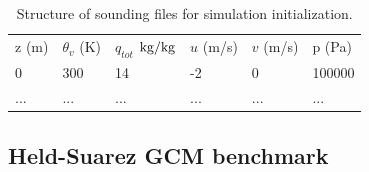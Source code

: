\documentclass{article}
\begin{document}
\begin{table}[t]
\centering
{\footnotesize
\caption[short]{Structure of sounding files for simulation initialization.}
\label{tab:DeltaDefinitionsTable}
\begin{tabular*}{\textwidth}{ @{\extracolsep{\fill}} llllll}
\hline
\hline
z (m) & $\theta_v$ (K) & $q_{tot}$ $\rm {kg/kg}$ & $u$ (m/s) & $v$ (m/s) & p (Pa)\\
0 & 300 & 14  & -2 & 0 & 100000\\
... & ... & ...  & ... & ... & ...\\
\hline

\hline
\hline
\end{tabular*}
}
\end{table}

\subsection{Held-Suarez GCM benchmark}



\end{document}
